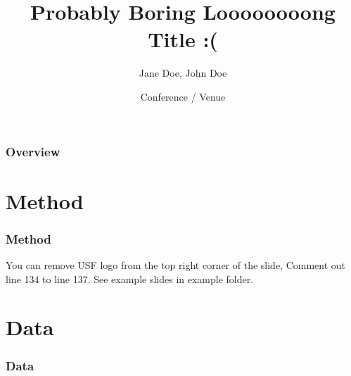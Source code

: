 \documentclass[unknownkeysallowed]{beamer}
\title[Sweet and Short Title :)]{Probably Boring Loooooooong Title :(} %
\author[Doe and Doe]{Jane Doe, John Doe} %
\institute[USF] %
{
Lab / Group / Program / Course \newline 
University of South Florida, FL, USA \\ \texttt{[image: images/USF\_logo\_v2.jpg]} \\ %
\medskip
\texttt{jane.doe@mail.usf.edu, john.doe@usf.edu} %
}
\date[]{Conference / Venue} %
\begin{document}
\begin{frame}
\titlepage %
\end{frame}



\begin{frame}
\frametitle{Overview} %
\tableofcontents %
\end{frame}



\section{Method}

\begin{frame}
\frametitle{Method}

You can remove USF logo from the top right corner of the slide, Comment out line 134 to line 137. See example slides in example folder.

\end{frame}




\section{Data}

\begin{frame}
\frametitle{Data}


\end{frame}
\end{document}
